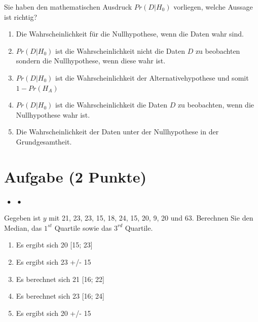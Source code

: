 \documentclass[a4paper, 9pt]{scrartcl}\usepackage[]{graphicx}\usepackage[]{xcolor}
\begin{document}
{Sie haben den mathematischen Ausdruck $Pr(D|H_0)$ vorliegen, welche Aussage ist richtig?



\begin{enumerate}
\item [\textbf{A} \msquare] Die Wahrscheinlichkeit für die Nullhypothese, wenn die Daten wahr sind.
\item [\textbf{B} \msquare] $Pr(D|H_0)$ ist die Wahrscheinlichkeit nicht die Daten $D$ zu beobachten sondern die Nullhypothese, wenn diese wahr ist.
\item [\textbf{C} \msquare] $Pr(D|H_0)$ ist die Wahrscheinlichkeit der Alternativehypothese und somit $1 - Pr(H_A)$
\item [\textbf{D} \msquare] $Pr(D|H_0)$ ist die Wahrscheinlichkeit die Daten $D$ zu beobachten, wenn die Nullhypothese wahr ist.
\item [\textbf{E} \msquare] Die Wahrscheinlichkeit der Daten unter der Nullhypothese in der Grundgesamtheit.
\end{enumerate} 

\section{Aufgabe \hfill (2 Punkte)}

\ifcollection
\begin{flushright}
\tiny\vspace{-2Ex}
\textbf{\examinhaltstart}
\exammodulemathstat $\;\bullet$
\exammodulestat $\;\bullet$
\exammodulestatbbv 
\vspace{-1Ex}
\end{flushright}
\fi




Gegeben ist $y$ mit 21, 23, 23, 15, 18, 24, 15, 20, 9, 20 und 63. Berechnen Sie den Median, das $1^{st}$ Quartile sowie das $3^{rd}$ Quartile.




\begin{enumerate}
\item [\textbf{A} \msquare] Es ergibt sich 20 [15; 23]
\item [\textbf{B} \msquare] Es ergibt sich 23 +/- 15
\item [\textbf{C} \msquare] Es berechnet sich 21 [16; 22]
\item [\textbf{D} \msquare] Es berechnet sich 23 [16; 24]
\item [\textbf{E} \msquare] Es ergibt sich 20 +/- 15
\end{enumerate} 

}
\end{document}
